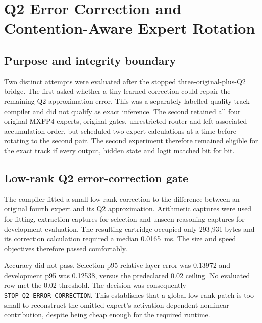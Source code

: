 
\section{Q2 Error Correction and Contention-Aware Expert Rotation}
\label{sec:gptoss120b-q2-correction-pairwise-rotation}

\subsection{Purpose and integrity boundary}

Two distinct attempts were evaluated after the stopped three-original-plus-Q2
bridge.  The first asked whether a tiny learned correction could repair the
remaining Q2 approximation error.  This was a separately labelled
quality-track compiler and did not qualify as exact inference.  The second
retained all four original MXFP4 experts, original gates, unrestricted router
and left-associated accumulation order, but scheduled two expert calculations
at a time before rotating to the second pair.  The second experiment therefore
remained eligible for the exact track if every output, hidden state and logit
matched bit for bit.

\subsection{Low-rank Q2 error-correction gate}

The compiler fitted a small low-rank correction to the difference between an
original fourth expert and its Q2 approximation.  Arithmetic captures were
used for fitting, extraction captures for selection and unseen reasoning
captures for development evaluation.  The resulting cartridge occupied only
293,931 bytes and its correction calculation required a median 0.0165~ms.
The size and speed objectives therefore passed comfortably.

Accuracy did not pass.  Selection p95 relative layer error was 0.13972 and
development p95 was 0.12538, versus the predeclared 0.02 ceiling.  No evaluated
row met the 0.02 threshold.  The decision was consequently
\texttt{STOP\_Q2\_ERROR\_CORRECTION}.  This establishes that a global low-rank
patch is too small to reconstruct the omitted expert's activation-dependent
nonlinear contribution, despite being cheap enough for the required runtime.

